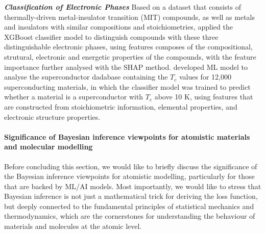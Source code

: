 \textbf{\textit{Classification of Electronic Phases}} Based on a dataset that consists of thermally-driven metal-insulator transition (MIT) compounds, as well as metals and insulators with similar compositions and stoichiometries, \citet{georgescu2021database} applied the XGBoost\cite{chen2016xgboost} classifier model to distinguish compounds with these three distinguishable electronic phases, using features composes of the compositional, strutural, electronic and energetic properties of the compounds, with the feature importance further analysed with the SHAP method.\cite{lundberg2017unified} \citet{stanev2018machine} developed ML model to analyse the superconductor dadabase containing the $T_c$ values for 12,000 superconducting materials, in which the classifier model was trained to predict whether a material is a superconductor with $T_c$ above 10 K, using features that are constructed from stoichiometric information, elemental properties, and electronic structure properties. 


\paragraph{\textbf{Significance of Bayesian inference viewpoints for atomistic materials and molecular modelling}}

Before concluding this section, we would like to briefly discuss the significance of the Bayesian inference viewpoints for atomistic modelling, particularly for those that are backed by ML/AI models. Most importantly, we would like to stress that Bayesian inference is not just a mathematical trick for deriving the loss function, but deeply connected to the fundamental principles of statistical mechanics and thermodynamics, which are the cornerstones for understanding the behaviour of materials and molecules at the atomic level. 

